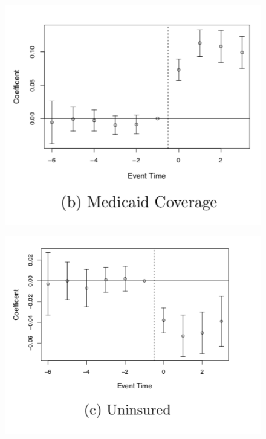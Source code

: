 \documentclass[notes=show]{beamer}
\begin{document}
\begin{frame}[plain]

	\begin{figure}
	\includegraphics[scale=0.5]{./lecture_includes/Miller_Medicaid2}
	\end{figure}

\end{frame}

\begin{frame}[plain]

	\begin{figure}
	\includegraphics[scale=0.5]{./lecture_includes/Miller_Medicaid3}
	\end{figure}

\end{frame}
\end{document}
